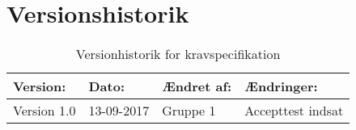 \chapter{Versionshistorik}
\begin{table}[H]
\begin{center}
\begin{tabular} {| p{4cm} | p{2cm} | p{2cm} |p{5cm} |}
\hline
\textbf{Version:} & \textbf{Dato:} & \textbf{Ændret af:} & \textbf{Ændringer:} \\ \hline
Version 1.0 & 13-09-2017 & Gruppe 1 & Accepttest indsat \\ \hline
\end{tabular}
\end{center}
\caption{Versionhistorik for kravspecifikation}
\label{tb:ksversion}
\end{table}